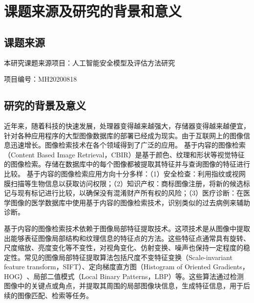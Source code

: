 \section{课题来源及研究的背景和意义}
\subsection{课题来源}
本研究课题来源项目：人工智能安全模型及评估方法研究
\par
项目编号：MH20200818
\subsection{研究的背景及意义}
近年来，随着科技的快速发展，处理器变得越来越强大，存储器变得越来越便宜，针对各种应用程序的大型图像数据库的部署已经成为现实。由于互联网上的图像信息迅速增长。图像检索技术在各个领域得到了广泛的应用。
基于内容的图像检索\cite{2015Content}（Content Based Image Retrieval，CBIR）是基于颜色、纹理和形状等视觉特征的图像检索。存储在数据库中的每个图像都被提取其特征并与查询图像的特征进行比较。
基于内容的图像检索应用方向十分多样：（1）安全检查：利用指纹或视网膜扫描等生物信息以获取访问权限；（2）知识产权：商标图像注册，将新的候选标记与现有标记进行比较，以确保没有混淆财产所有权的风险；（3）医疗诊断：在医学图像的医学数据库中使用基于内容的图像检索技术，识别类似的过去病例来辅助诊断。
\par
基于内容的图像检索技术依赖于图像局部特征提取技术。这项技术是从图像中提取出能够表征图像局部结构和纹理信息的特征点的方法。‌这些特征点通常具有旋转、‌尺度缩放、‌亮度变化等不变性，对视角变化、‌仿射变换、‌噪声也保持一定程度的稳定性。‌常见的图像局部特征提取算法包括‌尺度不变特征变换\cite{loweDistinctiveImageFeatures2004}（Scale-invariant feature transform，SIFT）、定向梯度直方图\cite{1467360}（Histogram of Oriented Gradients，HOG）‌、局部二值模式\cite{1017623}（Local Binary Patterns，LBP）‌等。‌这些算法通过检测图像中的关键点或角点，并提取其周围的局部图像块信息，生成特征信息，用于后续的图像匹配、‌检索等任务。

